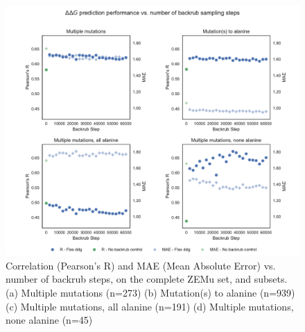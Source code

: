 \begin{figure}
  \includegraphics[width=\textwidth,keepaspectratio]{steps-v-corr_mult.pdf}
  \caption[Flex ddG performance vs. number of backrub steps]{
    Correlation (Pearson's R) and MAE (Mean Absolute Error) vs. number of backrub steps, on the complete ZEMu set, and subsets.
    (a) Multiple mutations (n=273)
    (b) Mutation(s) to alanine (n=939)
    (c) Multiple mutations, all alanine (n=191)
    (d) Multiple mutations, none alanine (n=45)
  } \label{fig:steps-v-corr_mult}
\end{figure}
